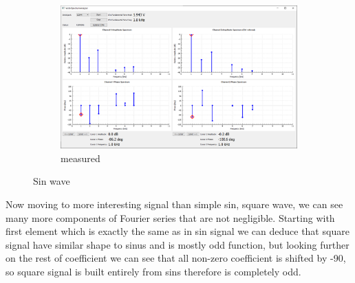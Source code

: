 \documentclass[notitlepage, a4paper, 11pt]{article}
\begin{document}
\begin{figure}[H]
\begin{subfigure}[][][t]{0.28\textwidth}
			\includegraphics[width=\textwidth, trim=10 80 555 100, clip]{../img/Circuit1/sin}
			\caption{measured}
			\label{fig:meas-signal-a}
		\end{subfigure}
		\caption{Sin wave}
		\label{fig:pure-sin}
	\end{figure}
	
	Now moving to more interesting signal than simple sin, square wave, we can see many more components of Fourier series that are not negligible. Starting with first element which is exactly the same as in sin signal we can deduce that square signal have similar shape to sinus and is mostly odd function, but looking further on the rest of coefficient we can see that all non-zero coefficient is shifted by -90\degree, so square signal is built entirely from sins therefore is completely odd.
	
\end{document}
